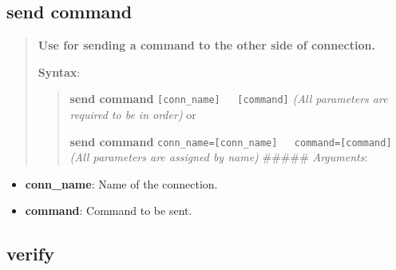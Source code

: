 \hypertarget{description-send-command}{%
\subsection{\texorpdfstring{\textbf{send
command}}{send command}}\label{description-send-command}}

\begin{quote}
\textbf{Use for sending a command to the other side of connection.}

\textbf{Syntax}:

\begin{quote}
\textbf{send command} \texttt{{[}conn\_name{]}\ \ \ {[}command{]}}
\emph{(All parameters are required to be in order)} or

\textbf{send command}
\texttt{conn\_name={[}conn\_name{]}\ \ \ command={[}command{]}}
\emph{(All parameters are assigned by name)} \#\#\#\#\#
\emph{Arguments}:
\end{quote}
\end{quote}

\begin{itemize}
\tightlist
\item
  \textbf{conn\_name}: Name of the connection.
\item
  \textbf{command}: Command to be sent.
\end{itemize}

\hypertarget{description-verify}{%
\subsection{\texorpdfstring{\textbf{verify}}{verify}}\label{description-verify}}

